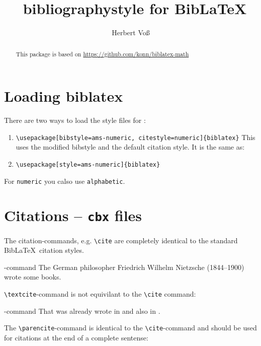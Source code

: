 \documentclass{article}
\begin{document}
	
\title{\AmS\ bibliographystyle for Bib\LaTeX}
\author{Herbert Voß}
\maketitle

\begin{abstract}
This package is based on \url{https://github.com/konn/biblatex-math}
\end{abstract}

\section{Loading biblatex}
There are two ways to load the style files for \AmS:

\begin{enumerate}
	\item \verb|\usepackage[bibstyle=ams-numeric, citestyle=numeric]{biblatex}|
	   This uses the modified bibstyle and the default citation style. It is
	   the same as:
	\item \verb|\usepackage[style=ams-numeric]{biblatex}|
\end{enumerate}

For \verb|numeric| you calso use \verb|alphabetic|.


\section{Citations -- \texttt{cbx} files}
The citation-commands, e.g. \verb|\cite| are completely identical to the
standard Bib\LaTeX\ citation styles.

\begin{exampleM}[righthand width=0.3\linewidth]{-command}
The German philosopher Friedrich Wilhelm Nietzsche (1844--1900) wrote some books.~\cite{nietzsche:ksa,nietzsche:ksa1}
\end{exampleM}

\verb|\textcite|-command is not equivilant to the \verb|\cite| command:

\begin{exampleM}[righthand width=0.3\linewidth]{-command}
That was already wrote in \textcite[see][p.\,23]{nietzsche:ksa} and also in \textcite{nietzsche:ksa1}.
\end{exampleM}

The \verb|\parencite|-command is identical to the \verb|\cite|-command
and should be used for citations at the end of
a complete sentense:
\end{document}
